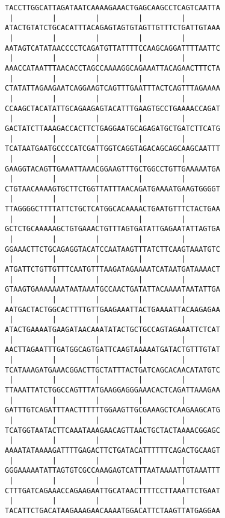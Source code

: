 \documentclass{article}
\begin{document}
\begin{Verbatim}
TACCTTGGCATTAGATAATCAAAAGAAACTGAGCAAGCCTCAGTCAATTA
 |         |         |         |         |        
ATACTGTATCTGCACATTTACAGAGTAGTGTAGTTGTTTCTGATTGTAAA
 |         |         |         |         |        
AATAGTCATATAACCCCTCAGATGTTATTTTCCAAGCAGGATTTTAATTC
 |         |         |         |         |        
AAACCATAATTTAACACCTAGCCAAAAGGCAGAAATTACAGAACTTTCTA
 |         |         |         |         |        
CTATATTAGAAGAATCAGGAAGTCAGTTTGAATTTACTCAGTTTAGAAAA
 |         |         |         |         |        
CCAAGCTACATATTGCAGAAGAGTACATTTGAAGTGCCTGAAAACCAGAT
 |         |         |         |         |        
GACTATCTTAAAGACCACTTCTGAGGAATGCAGAGATGCTGATCTTCATG
 |         |         |         |         |        
TCATAATGAATGCCCCATCGATTGGTCAGGTAGACAGCAGCAAGCAATTT
 |         |         |         |         |        
GAAGGTACAGTTGAAATTAAACGGAAGTTTGCTGGCCTGTTGAAAAATGA
 |         |         |         |         |        
CTGTAACAAAAGTGCTTCTGGTTATTTAACAGATGAAAATGAAGTGGGGT
 |         |         |         |         |        
TTAGGGGCTTTTATTCTGCTCATGGCACAAAACTGAATGTTTCTACTGAA
 |         |         |         |         |        
GCTCTGCAAAAAGCTGTGAAACTGTTTAGTGATATTGAGAATATTAGTGA
 |         |         |         |         |        
GGAAACTTCTGCAGAGGTACATCCAATAAGTTTATCTTCAAGTAAATGTC
 |         |         |         |         |        
ATGATTCTGTTGTTTCAATGTTTAAGATAGAAAATCATAATGATAAAACT
 |         |         |         |         |        
GTAAGTGAAAAAAATAATAAATGCCAACTGATATTACAAAATAATATTGA
 |         |         |         |         |        
AATGACTACTGGCACTTTTGTTGAAGAAATTACTGAAAATTACAAGAGAA
 |         |         |         |         |        
ATACTGAAAATGAAGATAACAAATATACTGCTGCCAGTAGAAATTCTCAT
 |         |         |         |         |        
AACTTAGAATTTGATGGCAGTGATTCAAGTAAAAATGATACTGTTTGTAT
 |         |         |         |         |        
TCATAAAGATGAAACGGACTTGCTATTTACTGATCAGCACAACATATGTC
 |         |         |         |         |        
TTAAATTATCTGGCCAGTTTATGAAGGAGGGAAACACTCAGATTAAAGAA
 |         |         |         |         |        
GATTTGTCAGATTTAACTTTTTTGGAAGTTGCGAAAGCTCAAGAAGCATG
 |         |         |         |         |        
TCATGGTAATACTTCAAATAAAGAACAGTTAACTGCTACTAAAACGGAGC
 |         |         |         |         |        
AAAATATAAAAGATTTTGAGACTTCTGATACATTTTTTCAGACTGCAAGT
 |         |         |         |         |        
GGGAAAAATATTAGTGTCGCCAAAGAGTCATTTAATAAAATTGTAAATTT
 |         |         |         |         |        
CTTTGATCAGAAACCAGAAGAATTGCATAACTTTTCCTTAAATTCTGAAT
 |         |         |         |         |        
TACATTCTGACATAAGAAAGAACAAAATGGACATTCTAAGTTATGAGGAA

\end{Verbatim}
\end{document}

